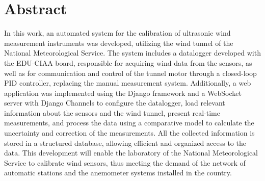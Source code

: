 \chapter*{Abstract}
In this work, an automated system for the calibration of ultrasonic wind measurement instruments was developed, utilizing the wind tunnel of the National Meteorological Service. The system includes a datalogger developed with the EDU-CIAA board, responsible for acquiring wind data from the sensors, as well as for communication and control of the tunnel motor through a closed-loop PID controller, replacing the manual measurement system. Additionally, a web application was implemented using the Django framework and a WebSocket server with Django Channels to configure the datalogger, load relevant information about the sensors and the wind tunnel, present real-time measurements, and process the data using a comparative model to calculate the uncertainty and correction of the measurements. All the collected information is stored in a structured database, allowing efficient and organized access to the data. This development will enable the laboratory of the National Meteorological Service to calibrate wind sensors, thus meeting the demand of the network of automatic stations and the anemometer systems installed in the country.